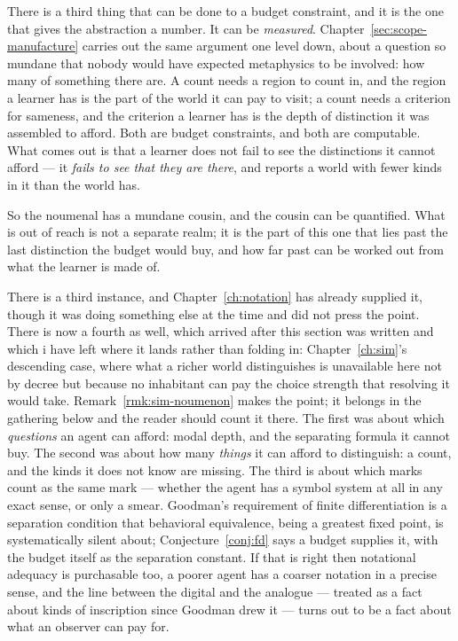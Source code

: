 There is a third thing that can be done to a budget constraint, and
it is the one that gives the abstraction a number.
It can be \emph{measured}.
Chapter~\ref{sec:scope-manufacture} carries out the same argument
one level down, about a question so mundane that nobody would have
expected metaphysics to be involved: how many of something there
are.
A count needs a region to count in, and the region a learner has is
the part of the world it can pay to visit; a count needs a criterion
for sameness, and the criterion a learner has is the depth of
distinction it was assembled to afford.
Both are budget constraints, and both are computable.
What comes out is that a learner does not fail to see the
distinctions it cannot afford --- it \emph{fails to see that they
are there}, and reports a world with fewer kinds in it than the
world has.

So the noumenal has a mundane cousin, and the cousin can be
quantified. What is out of reach is not a separate realm; it is the
part of this one that lies past the last distinction the budget
would buy, and how far past can be worked out from what the learner
is made of.

There is a third instance, and Chapter~\ref{ch:notation} has
already supplied it, though it was doing something else at the time
and did not press the point.
There is now a fourth as well, which arrived after this section was
written and which i have left where it lands rather than folding in:
Chapter~\ref{ch:sim}'s descending case, where what a richer world
distinguishes is unavailable here not by decree but because no
inhabitant can pay the choice strength that resolving it would take.
Remark~\ref{rmk:sim-noumenon} makes the point; it belongs in the
gathering below and the reader should count it there.
The first was about which \emph{questions} an agent can afford:
modal depth, and the separating formula it cannot buy.
The second was about how many \emph{things} it can afford to
distinguish: a count, and the kinds it does not know are missing.
The third is about which marks count as the same mark --- whether
the agent has a symbol system at all in any exact sense, or only a
smear.
Goodman's requirement of finite differentiation is a separation
condition that behavioral equivalence, being a greatest fixed
point, is systematically silent about;
Conjecture~\ref{conj:fd} says a budget supplies it, with the budget
itself as the separation constant.
If that is right then notational adequacy is purchasable too, a
poorer agent has a coarser notation in a precise sense, and the
line between the digital and the analogue --- treated as a fact
about kinds of inscription since Goodman drew it --- turns out to
be a fact about what an observer can pay for.

